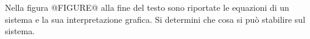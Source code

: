 Nella figura 
@FIGURE@ alla fine del testo
sono riportate le equazioni di un sistema e la sua interpretazione grafica. 
Si determini che cosa si può stabilire sul sistema.
